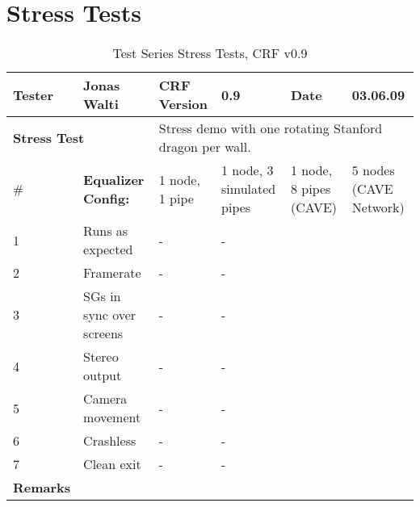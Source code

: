 \section{Stress Tests}
\begin{table}[H]
	\centering
	\begin{tabular}{|b{}|b{}|m{}|m{}|m{}|m{}|}
		\hline
		\bfseries Tester & Jonas Walti & \bfseries CRF Version & 0.9 & \bfseries Date & 03.06.09 \\
		\hline
		\hline
		\multicolumn{2}{|l|}{\large{\bfseries Stress Test}} & \multicolumn{4}{p{0.6\textwidth}|}{Stress demo with one rotating Stanford dragon per wall.} \\
		\hline
		\hline
		\# & \bfseries Equalizer Config: & 1 node, 1 pipe & 1 node, 3 simulated pipes &  1 node, 8 pipes (CAVE) &  5 nodes (CAVE Network) \\
		\hline 1 & Runs as expected & \quad\quad- & \quad\quad- & \tick & \tick \\
		\hline 2 & Framerate & \quad\quad- & \quad\quad- & \quad\quad18 & \quad\quad97 \\
		\hline 3 & SGs in sync over screens & \quad\quad- & \quad\quad- & \tick & \tick \\
		\hline 4 & Stereo output & \quad\quad- & \quad\quad- & \tick & \tick \\
		\hline 5 & Camera movement & \quad\quad- & \quad\quad- & \tick & \tick \\
		\hline 6 & Crashless & \quad\quad- & \quad\quad- & \tick & \tick \\
		\hline 7 & Clean exit & \quad\quad- & \quad\quad- & \tick & \tick \\
		\hline
		\hline \bfseries Remarks & \multicolumn{5}{p{0.85\textwidth}|}{}\\
		\hline
	\end{tabular}
	\caption{Test Series Stress Tests, CRF v0.9}
\end{table}

